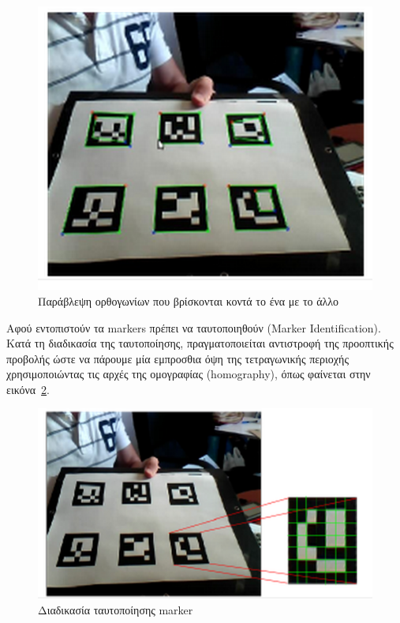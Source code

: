 \begin{figure}[H]
    \centering
    \includegraphics[scale=0.55, angle=0]{Files/Figures/aruco4.png}
    \caption[Παράβλεψη ορθογωνίων που βρίσκονται κοντά το ένα με το άλλο]{Παράβλεψη ορθογωνίων που βρίσκονται κοντά το ένα με το άλλο}
    \label{fig:aruco4}
\end{figure}



Αφού εντοπιστούν τα markers πρέπει να ταυτοποιηθούν (Marker Identification). Κατά τη διαδικασία της ταυτοποίησης, πραγματοποιείται αντιστροφή της προοπτικής προβολής ώστε να πάρουμε μία εμπροσθια όψη της τετραγωνικής περιοχής χρησιμοποιώντας τις αρχές της ομογραφίας (homography), όπως φαίνεται στην εικόνα~\ref{fig:aruco5}.


\begin{figure}[H]
    \centering
    \includegraphics[scale=0.55, angle=0]{Files/Figures/aruco5.png}
    \caption[Διαδικασία ταυτοποίησης marker]{Διαδικασία ταυτοποίησης marker}
    \label{fig:aruco5}
\end{figure}



